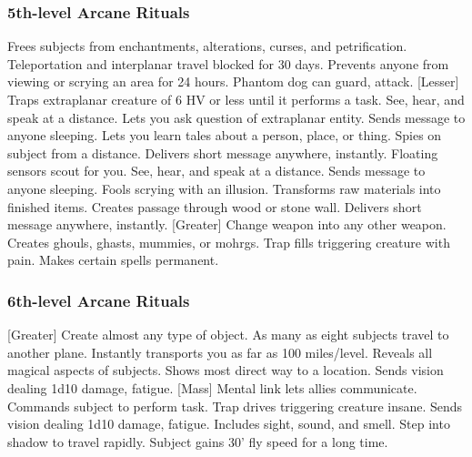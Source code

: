 \subsubsection{5th-level Arcane Rituals}
\begin{rituallist}
     Frees subjects from enchantments, alterations, curses, and petrification.
     Teleportation and interplanar travel blocked for 30 days.
     Prevents anyone from viewing or scrying an area for 24 hours.
     Phantom dog can guard, attack.
    [Lesser] Traps extraplanar creature of 6 HV or less until it performs a task.
     See, hear, and speak at a distance.
     Lets you ask question of extraplanar entity.
     Sends message to anyone sleeping.
    \F Lets you learn tales about a person, place, or thing.
    \F Spies on subject from a distance.
     Delivers short message anywhere, instantly.
     Floating sensors scout for you.
     See, hear, and speak at a distance.
     Sends message to anyone sleeping.
     Fools scrying with an illusion.
     Transforms raw materials into finished items.
     Creates passage through wood or stone wall.
     Delivers short message anywhere, instantly.
    [Greater] Change weapon into any other weapon.
     Creates ghouls, ghasts, mummies, or mohrgs.
     Trap fills triggering creature with pain.
     Makes certain spells permanent.
\end{rituallist}

\subsubsection{6th-level Arcane Rituals}
\begin{rituallist}
    [Greater] Create almost any type of object.
    \F As many as eight subjects travel to another plane.
     Instantly transports you as far as 100 miles/level.
      Reveals all magical aspects of subjects.
     Shows most direct way to a location.
     Sends vision dealing 1d10 damage, fatigue.
    [Mass] Mental link lets allies communicate.
     Commands subject to perform task.
     Trap drives triggering creature insane.
     Sends vision dealing 1d10 damage, fatigue.
     Includes sight, sound, and smell.
     Step into shadow to travel rapidly.
     Subject gains 30' fly speed for a long time.
\end{rituallist}

